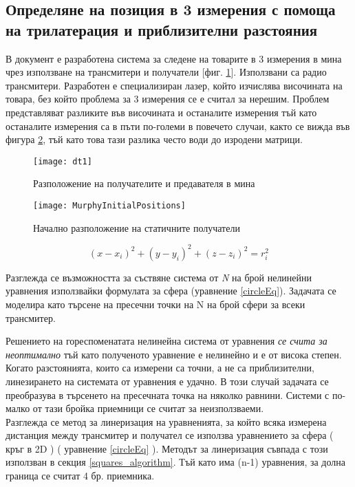 \subsection{Определяне на позиция в 3 измерения с помоща на трилатерация и приблизителни разстояния}

В документ \cite{murphy} е разработена система за следене на товарите в 3 измерения в мина чрез използване на трансмитери и получатели [фиг. \ref{fig:mine}]. Използвани са радио трансмитери. Разработен е специализиран лазер, който изчислява височината на товара, без който проблема за 3 измерения се е считал за нерешим. Проблем представляват разликите във височината и останалите измерения тъй като останалите измерения са в пъти по-големи в повечето случаи, както се вижда във фигура \ref{fig:initPos}, тъй като това тази разлика често води до изродени матрици.

\begin{figure}
    \centering
    \centerline{\texttt{[image: dt1]}}
    \caption{Разположение на получателите и предавателя в мина}
    \label{fig:mine}
\end{figure}

\begin{figure}
    \centering
    \centerline{\texttt{[image: MurphyInitialPositions]}}
    \caption{Начално разположение на статичните получатели}
    \label{fig:initPos}
\end{figure}


\begin{equation}\label{circleEq}
    (x-x_i)^2 + (y-y_i)^2 +(z-z_i)^2=r_i^2
\end{equation}

Разглежда се възможността за съствяне система от \textit{N} на брой нелинейни уравнения използвайки формулата за сфера (уравнение \ref{circleEq}). Задачата се моделира като търсене на пресечни точки на N на брой сфери за всеки трансмитер.

Решението на гореспоменатата нелинейна система от уравнения \emph{се счита за неоптимално} тъй като полученото уравнение е нелинейно и е от висока степен. Когато разстоянията, които са измерени са точни, а не са приблизителни, линезирането на системата от уравнения е удачно. В този случай задачата се преобразува в търсенето на пресечната точка на няколко равнини. Системи с по-малко от тази бройка приемници се считат за неизползваеми. \\

Разглежда се метод за линеризация на уравненията, за който всяка измерена дистанция между трансмитер и получател се използва уравнението за сфера ( кръг в 2D ) ( уравнение \ref{circleEq} ). Методът за линеризация съвпада с този използван в секция \ref{squares_algorithm}. Тъй като има (n-1) уравнения, за долна граница се считат 4 бр. приемника.
\\


